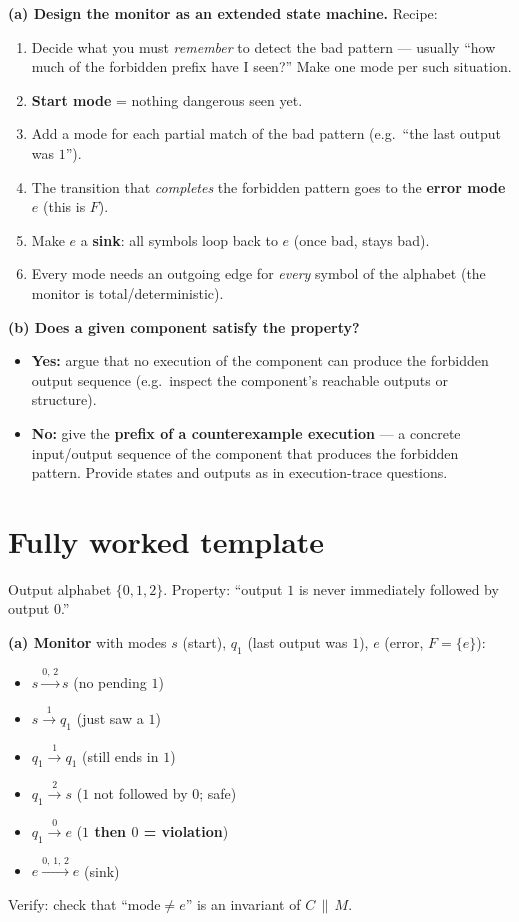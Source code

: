 \textbf{(a) Design the monitor as an extended state machine.} Recipe:
\begin{enumerate}
  \item Decide what you must \emph{remember} to detect the bad pattern --- usually ``how much of the forbidden prefix have I seen?'' Make one mode per such situation.
  \item \textbf{Start mode} = nothing dangerous seen yet.
  \item Add a mode for each partial match of the bad pattern (e.g.\ ``the last output was $1$'').
  \item The transition that \emph{completes} the forbidden pattern goes to the \textbf{error mode} $e$ (this is $F$).
  \item Make $e$ a \textbf{sink}: all symbols loop back to $e$ (once bad, stays bad).
  \item Every mode needs an outgoing edge for \emph{every} symbol of the alphabet (the monitor is total/deterministic).
\end{enumerate}

\textbf{(b) Does a given component satisfy the property?}
\begin{itemize}
  \item \textbf{Yes:} argue that no execution of the component can produce the forbidden output sequence (e.g.\ inspect the component's reachable outputs or structure).
  \item \textbf{No:} give the \textbf{prefix of a counterexample execution} --- a concrete input/output sequence of the component that produces the forbidden pattern. Provide states and outputs as in execution-trace questions.
\end{itemize}

\section{Fully worked template}
Output alphabet $\{0,1,2\}$. Property: ``output $1$ is never immediately followed by output $0$.''

\textbf{(a) Monitor} with modes $s$ (start), $q_1$ (last output was $1$), $e$ (error, $F=\{e\}$):
\begin{itemize}
  \item $s \xrightarrow{0,\,2} s$ \hfill (no pending $1$)
  \item $s \xrightarrow{1} q_1$ \hfill (just saw a $1$)
  \item $q_1 \xrightarrow{1} q_1$ \hfill (still ends in $1$)
  \item $q_1 \xrightarrow{2} s$ \hfill ($1$ not followed by $0$; safe)
  \item $q_1 \xrightarrow{0} e$ \hfill (\textbf{$1$ then $0$ = violation})
  \item $e \xrightarrow{0,\,1,\,2} e$ \hfill (sink)
\end{itemize}
Verify: check that ``$\text{mode}\neq e$'' is an invariant of $C\,\|\,M$.

